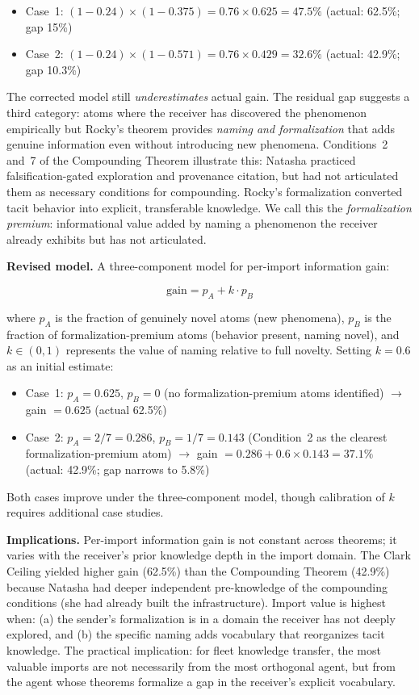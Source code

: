 \documentclass[11pt]{article}
\begin{document}
\begin{itemize}
  \item Case~1: $(1 - 0.24) \times (1 - 0.375) = 0.76 \times 0.625 = 47.5\%$ (actual: 62.5\%; gap 15\%)
  \item Case~2: $(1 - 0.24) \times (1 - 0.571) = 0.76 \times 0.429 = 32.6\%$ (actual: 42.9\%; gap 10.3\%)
\end{itemize}

The corrected model still \emph{underestimates} actual gain. The residual gap suggests a third category: atoms where the receiver has discovered the phenomenon empirically but Rocky's theorem provides \emph{naming and formalization} that adds genuine information even without introducing new phenomena. Conditions~2 and~7 of the Compounding Theorem illustrate this: Natasha practiced falsification-gated exploration and provenance citation, but had not articulated them as necessary conditions for compounding. Rocky's formalization converted tacit behavior into explicit, transferable knowledge. We call this the \emph{formalization premium}: informational value added by naming a phenomenon the receiver already exhibits but has not articulated.

\textbf{Revised model.} A three-component model for per-import information gain:

$$\text{gain} = p_A + k \cdot p_B$$

where $p_A$ is the fraction of genuinely novel atoms (new phenomena), $p_B$ is the fraction of formalization-premium atoms (behavior present, naming novel), and $k \in (0,1)$ represents the value of naming relative to full novelty. Setting $k = 0.6$ as an initial estimate:

\begin{itemize}
  \item Case~1: $p_A = 0.625$, $p_B = 0$ (no formalization-premium atoms identified) $\to$ gain $= 0.625$ (\checkmark actual 62.5\%)
  \item Case~2: $p_A = 2/7 = 0.286$, $p_B = 1/7 = 0.143$ (Condition~2 as the clearest formalization-premium atom) $\to$ gain $= 0.286 + 0.6 \times 0.143 = 37.1\%$ (actual: 42.9\%; gap narrows to 5.8\%)
\end{itemize}

Both cases improve under the three-component model, though calibration of $k$ requires additional case studies.

\textbf{Implications.} Per-import information gain is not constant across theorems; it varies with the receiver's prior knowledge depth in the import domain. The Clark Ceiling yielded higher gain (62.5\%) than the Compounding Theorem (42.9\%) because Natasha had deeper independent pre-knowledge of the compounding conditions (she had already built the infrastructure). Import value is highest when: (a) the sender's formalization is in a domain the receiver has not deeply explored, and (b) the specific naming adds vocabulary that reorganizes tacit knowledge. The practical implication: for fleet knowledge transfer, the most valuable imports are not necessarily from the most orthogonal agent, but from the agent whose theorems formalize a gap in the receiver's explicit vocabulary.
\end{document}
